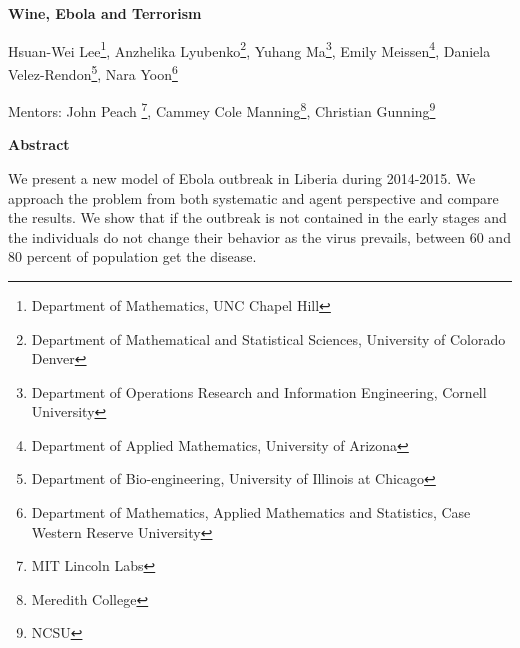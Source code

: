 \documentclass[10pt]{article}
\begin{document}
 

%
%
%
%
%
%
%
%
%

\centerline{\large \bf Wine, Ebola and Terrorism}

\vspace{.1truein}

\def\thefootnote{\arabic{footnote}}
\begin{center}
  Hsuan-Wei Lee\footnote{Department of Mathematics, UNC Chapel Hill},
  Anzhelika Lyubenko\footnote{Department of Mathematical and Statistical Sciences, University of Colorado Denver},
  Yuhang Ma\footnote{Department of Operations Research and Information Engineering, Cornell University},
  Emily Meissen\footnote{Department of Applied Mathematics, University of Arizona},
  Daniela Velez-Rendon\footnote{Department of Bio-engineering, University of Illinois at Chicago},
    Nara Yoon\footnote{
Department of Mathematics, Applied Mathematics and Statistics, Case Western Reserve University}
\end{center}


\begin{center}
Mentors: John Peach \footnote{MIT Lincoln Labs}, Cammey Cole Manning\footnote{Meredith College},
Christian Gunning\footnote{NCSU}
\end{center}
%
%
%
%
%
%
%
%
%

\vspace{.3truein}
\centerline{\bf Abstract}

We present a new model of Ebola outbreak in Liberia during 2014-2015. We approach the problem from both systematic and agent perspective and compare the results. We show that if the outbreak is not contained in the early stages and the individuals do not change their behavior as the virus prevails, between 60 and 80 percent of population get the disease. 

%
%
%
%
%
%
%
%
%
\end{document}
